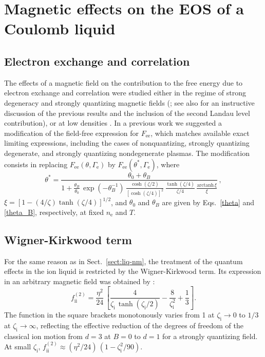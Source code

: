 \documentclass[traditabstract]{aa}
\newcommand{\beq}{\begin{equation}}
\newcommand{\eeq}{\end{equation}}
\newcommand{\Gamme}{\Gamma_\mathrm{e}}
\newcommand{\nel}{n_\mathrm{e}}
\newcommand{\zeti}{\zeta_\mathrm{i}}
\begin{document}
{%
\section{Magnetic effects on the EOS of a Coulomb liquid}
\label{sect:mag-other}

\subsection{Electron exchange and correlation}
\label{sect:ee-mag}

The effects of a magnetic field on the contribution to the
free energy due to electron exchange and correlation were
studied either in the regime of strong degeneracy and
strongly quantizing magnetic fields
(\citealp{DanzGlasser,BanerjeeCR,Fushiki-ea}; see also
\citealp{MorbecCapelle08} for an instructive discussion of
the previous results and the inclusion of the second Landau
level contribution), or at low densities
\citep{AlaJanco,Cornu,Steinberg,Steinberg2}. In a previous
work \citep{PCS} we suggested a modification of the
field-free expression for $F_\mathrm{ee}$, which matches
available exact limiting expressions, including the cases of
nonquantizing, strongly quantizing degenerate,
and strongly quantizing nondegenerate plasmas. The
modification consists in replacing
$F_\mathrm{ee}(\theta,\Gamme)$
by
$F_\mathrm{ee}(\theta^\ast,\Gamme)$,
where
\beq
  \theta^\ast =
   \frac{ \theta_0 + \theta_B 
      }{\displaystyle
          1+\frac{\theta_B}{\theta_0 }\,\exp(-\theta_B^{-1})\,
            \frac{\cosh (\zeta/2)}{[ \cosh(\zeta/4)]^2}
          \, \frac{\tanh (\zeta/4) }{ \zeta/4 } \,
          \frac{\mathrm{arctanh}\,\xi
        }{ \xi}
           }\,,
\label{theta-ast}
\eeq
$\xi=[1-(4/\zeta)\tanh (\zeta/4)]^{1/2}$,
and $\theta_0$ and $\theta_B$ are given by
Eqs.~\ref{theta} and \ref{theta_B}, respectively,
at fixed $\nel$ and $T$.

\subsection{Wigner-Kirkwood term}
\label{sect:fq-mag}

For the same reason as in Sect.~\ref{sect:liq-nm}, the
treatment of the quantum effects in the ion liquid is
restricted by the Wigner-Kirkwood term. Its expression in an
arbitrary magnetic field was obtained by \citet{AlaJanco}:
\beq
   f_\mathrm{ii}^{(2)}=\frac{\eta^2}{24}\,
    \left[ \frac{4}{\zeti\,\tanh (\zeti/2)} - \frac{8}{\zeti^2}
          + \frac{1}{3} \right].
\label{fq-mag}
\eeq
The function in the square brackets monotonously varies from
1 at $\zeti\to0$ to $1/3$ at $\zeti\to\infty$, reflecting the
effective reduction of the degrees of freedom of the
classical ion motion from $d=3$ at $B=0$ to $d=1$ for
a strongly quantizing field. At small $\zeti$,
$f_\mathrm{ii}^{(2)} \approx (\eta^2/24)\,(1-\zeti^2/90)$.

}
\end{document}
